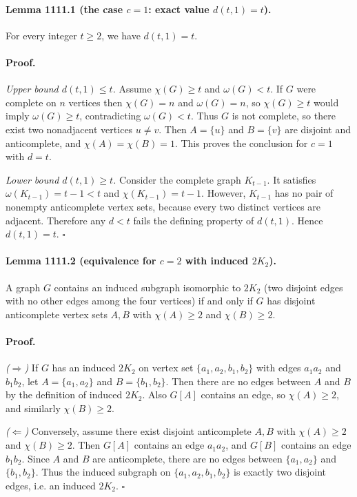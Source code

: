 \paragraph{Lemma 1111.1 (the case $c=1$: exact value $d(t,1)=t$).}
For every integer $t\ge 2$, we have $d(t,1)=t$.

\paragraph{Proof.}
\emph{Upper bound $d(t,1)\le t$.}
Assume $\chi(G)\ge t$ and $\omega(G)<t$.
If $G$ were complete on $n$ vertices then $\chi(G)=n$ and $\omega(G)=n$, so $\chi(G)\ge t$ would imply $\omega(G)\ge t$, contradicting $\omega(G)<t$.
Thus $G$ is not complete, so there exist two nonadjacent vertices $u\ne v$.
Then $A=\{u\}$ and $B=\{v\}$ are disjoint and anticomplete, and $\chi(A)=\chi(B)=1$.
This proves the conclusion for $c=1$ with $d=t$.

\emph{Lower bound $d(t,1)\ge t$.}
Consider the complete graph $K_{t-1}$.
It satisfies $\omega(K_{t-1})=t-1<t$ and $\chi(K_{t-1})=t-1$.
However, $K_{t-1}$ has no pair of nonempty anticomplete vertex sets, because every two distinct vertices are adjacent.
Therefore any $d< t$ fails the defining property of $d(t,1)$.
Hence $d(t,1)=t$. \hfill $\square$

\paragraph{Lemma 1111.2 (equivalence for $c=2$ with induced $2K_2$).}
A graph $G$ contains an induced subgraph isomorphic to $2K_2$ (two disjoint edges with no other edges among the four vertices) if and only if $G$ has disjoint anticomplete vertex sets $A,B$ with $\chi(A)\ge 2$ and $\chi(B)\ge 2$.

\paragraph{Proof.}
\emph{($\Rightarrow$)} If $G$ has an induced $2K_2$ on vertex set $\{a_1,a_2,b_1,b_2\}$ with edges $a_1a_2$ and $b_1b_2$, let $A=\{a_1,a_2\}$ and $B=\{b_1,b_2\}$.
Then there are no edges between $A$ and $B$ by the definition of induced $2K_2$.
Also $G[A]$ contains an edge, so $\chi(A)\ge 2$, and similarly $\chi(B)\ge 2$.

\emph{($\Leftarrow$)} Conversely, assume there exist disjoint anticomplete $A,B$ with $\chi(A)\ge 2$ and $\chi(B)\ge 2$.
Then $G[A]$ contains an edge $a_1a_2$, and $G[B]$ contains an edge $b_1b_2$.
Since $A$ and $B$ are anticomplete, there are no edges between $\{a_1,a_2\}$ and $\{b_1,b_2\}$.
Thus the induced subgraph on $\{a_1,a_2,b_1,b_2\}$ is exactly two disjoint edges, i.e. an induced $2K_2$.
\hfill $\square$

